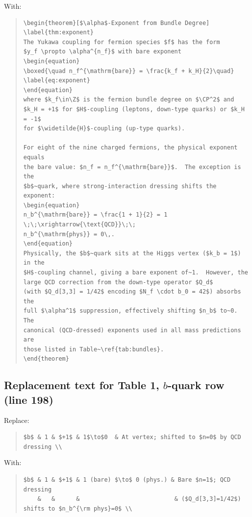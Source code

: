 \documentclass[11pt]{article}
\begin{document}
With:
\begin{quote}
\begin{verbatim}
\begin{theorem}[$\alpha$-Exponent from Bundle Degree]
\label{thm:exponent}
The Yukawa coupling for fermion species $f$ has the form
$y_f \propto \alpha^{n_f}$ with bare exponent
\begin{equation}
\boxed{\quad n_f^{\mathrm{bare}} = \frac{k_f + k_H}{2}\quad}
\label{eq:exponent}
\end{equation}
where $k_f\in\Z$ is the fermion bundle degree on $\CP^2$ and
$k_H = +1$ for $H$-coupling (leptons, down-type quarks) or $k_H = -1$
for $\widetilde{H}$-coupling (up-type quarks).

For eight of the nine charged fermions, the physical exponent equals
the bare value: $n_f = n_f^{\mathrm{bare}}$.  The exception is the
$b$~quark, where strong-interaction dressing shifts the exponent:
\begin{equation}
n_b^{\mathrm{bare}} = \frac{1 + 1}{2} = 1 \;\;\xrightarrow{\text{QCD}}\;\;
n_b^{\mathrm{phys}} = 0\,.
\end{equation}
Physically, the $b$~quark sits at the Higgs vertex ($k_b = 1$) in the
$H$-coupling channel, giving a bare exponent of~1.  However, the
large QCD correction from the down-type operator $Q_d$
(with $Q_d[3,3] = 1/42$ encoding $N_f \cdot b_0 = 42$) absorbs the
full $\alpha^1$ suppression, effectively shifting $n_b$ to~0.  The
canonical (QCD-dressed) exponents used in all mass predictions are
those listed in Table~\ref{tab:bundles}.
\end{theorem}
\end{verbatim}
\end{quote}

\subsection*{Replacement text for Table 1, $b$-quark row (line 198)}

Replace:
\begin{quote}
\verb|$b$ & 1 & $+1$ & 1$\to$0  & At vertex; shifted to $n=0$ by QCD dressing \\|
\end{quote}

With:
\begin{quote}
\verb|$b$ & 1 & $+1$ & 1 (bare) $\to$ 0 (phys.) & Bare $n=1$; QCD dressing|\\
\verb|    &   &      &                           & ($Q_d[3,3]=1/42$) shifts to $n_b^{\rm phys}=0$ \\|
\end{quote}
\end{document}
